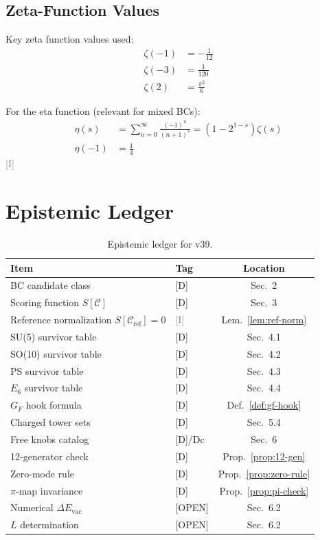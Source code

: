 \documentclass[11pt,a4paper]{article}
\newcommand{\tagD}{\textcolor{blue!70!black}{[D]}}
\newcommand{\tagI}{\textcolor{gray}{[I]}}
\newcommand{\tagOPEN}{\textcolor{red!70!black}{[OPEN]}}
\begin{document}
\subsection{Zeta-Function Values}

Key zeta function values used:
\begin{align}
\label{eq:zeta-minus1}
\zeta(-1) &= -\frac{1}{12} \\
\label{eq:zeta-minus3}
\zeta(-3) &= \frac{1}{120} \\
\label{eq:zeta-2}
\zeta(2) &= \frac{\pi^2}{6}
\end{align}

For the eta function (relevant for mixed BCs):
\begin{align}
\label{eq:eta-def}
\eta(s) &= \sum_{n=0}^\infty \frac{(-1)^n}{(n+1)^s} = (1 - 2^{1-s})\zeta(s) \\
\label{eq:eta-minus1}
\eta(-1) &= \frac{1}{4}
\end{align}
\tagI

\section{Epistemic Ledger}
\label{app:ledger}

\begin{table}[h]
\centering
\begin{tabular}{llc}
\toprule
Item & Tag & Location \\
\midrule
BC candidate class & \tagD & Sec.~2 \\
Scoring function $S[\mathcal{C}]$ & \tagD & Sec.~3 \\
Reference normalization $S[\mathcal{C}_{\text{ref}}] = 0$ & \tagI & Lem.~\ref{lem:ref-norm} \\
SU(5) survivor table & \tagD & Sec.~4.1 \\
SO(10) survivor table & \tagD & Sec.~4.2 \\
PS survivor table & \tagD & Sec.~4.3 \\
$E_6$ survivor table & \tagD & Sec.~4.4 \\
$G_F$ hook formula & \tagD & Def.~\ref{def:gf-hook} \\
Charged tower sets & \tagD & Sec.~5.4 \\
Free knobs catalog & \tagD/Dc & Sec.~6 \\
12-generator check & \tagD & Prop.~\ref{prop:12-gen} \\
Zero-mode rule & \tagD & Prop.~\ref{prop:zero-rule} \\
$\pi$-map invariance & \tagD & Prop.~\ref{prop:pi-check} \\
Numerical $\Delta E_{\text{vac}}$ & \tagOPEN & Sec.~6.2 \\
$L$ determination & \tagOPEN & Sec.~6.2 \\
\bottomrule
\end{tabular}
\caption{Epistemic ledger for v39.}
\label{tab:ledger}
\end{table}

\end{document}
